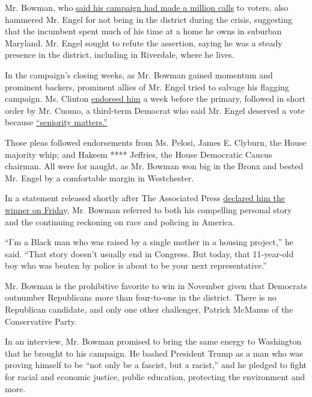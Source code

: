 Mr. Bowman, who
\href{https://twitter.com/JamaalBowmanNY/status/1275167126563762177}{said
his campaign had made a million calls} to voters, also hammered Mr.
Engel for not being in the district during the crisis, suggesting that
the incumbent spent much of his time at a home he owns in suburban
Maryland. Mr. Engel sought to refute the assertion, saying he was a
steady presence in the district, including in Riverdale, where he lives.

In the campaign's closing weeks, as Mr. Bowman gained momentum and
prominent backers, prominent allies of Mr. Engel tried to salvage his
flagging campaign. Ms. Clinton
\href{https://www.nytimes3xbfgragh.onion/2020/06/15/us/politics/hillary-clinton-eliot-engel.html?searchResultPosition=1}{endorsed
him} a week before the primary, followed in short order by Mr. Cuomo, a
third-term Democrat who said Mr. Engel deserved a vote because
\href{https://twitter.com/jessemckinley/status/1273706531868102658}{``seniority
matters.''}

Those pleas followed endorsements from Ms. Pelosi, James E. Clyburn, the
House majority whip; and Hakeem **** Jeffries, the House Democratic
Caucus chairman. All were for naught, as Mr. Bowman won big in the Bronx
and bested Mr. Engel by a comfortable margin in Westchester.

In a statement released shortly after The Associated Press
\href{https://twitter.com/AP_Politics/status/1284144985651249154}{declared
him the winner on Frida}y, Mr. Bowman referred to both his compelling
personal story and the continuing reckoning on race and policing in
America.

``I'm a Black man who was raised by a single mother in a housing
project,'' he said. ``That story doesn't usually end in Congress. But
today, that 11-year-old boy who was beaten by police is about to be your
next representative.''

Mr. Bowman is the prohibitive favorite to win in November given that
Democrats outnumber Republicans more than four-to-one in the district.
There is no Republican candidate, and only one other challenger, Patrick
McManus of the Conservative Party.

In an interview, Mr. Bowman promised to bring the same energy to
Washington that he brought to his campaign. He bashed President Trump as
a man who was proving himself to be ``not only be a fascist, but a
racist,'' and he pledged to fight for racial and economic justice,
public education, protecting the environment and more.

